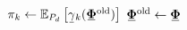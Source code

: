 \begin{algorithm}[t]
\begin{algorithmic}[1]
    \STATE $\pi_k \gets \EE_{P_d}\left[ \ubar{\gamma}_k(\ubar{\bm{\Phi}}^{\mathrm{old}}) \right]$%
    \STATE $\ubar{\bm{\Phi}}^{\mathrm{old}} \gets \ubar{\bm{\Phi}}$
    \ENDIF
    
    
    \ENDFOR
  \end{algorithmic}
\end{algorithm}



